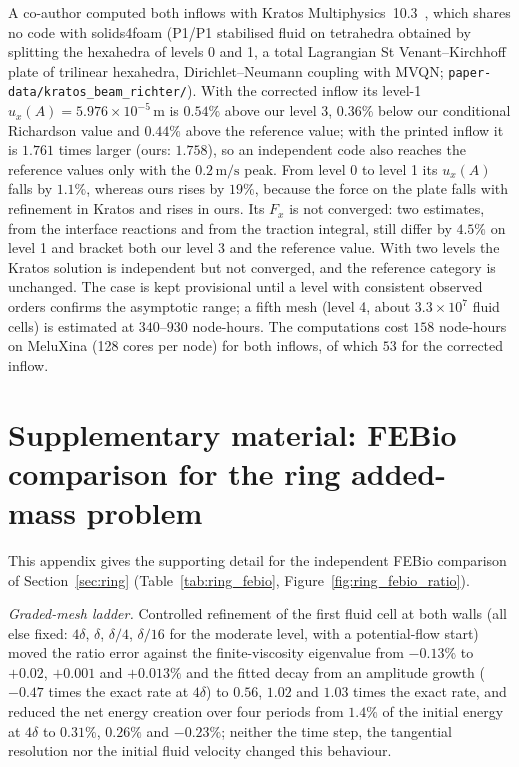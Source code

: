 \documentclass[sn-mathphys,Numbered]{sn-jnl}%
\newif\ifsupplementseparate
\renewcommand\paragraph[1]{\par\addvspace{1.2ex plus .4ex minus .2ex}%
	\noindent{\normalfont\bfseries #1}\hspace{0.5em}\ignorespaces}
\begin{document}
\begin{appendices}
\paragraph{An independent solution.}
A co-author computed both inflows with Kratos Multiphysics~10.3~\citep{Dadvand2010}, which shares no code with solids4foam (P1/P1 stabilised fluid on tetrahedra obtained by splitting the hexahedra of levels 0 and 1, a total Lagrangian St Venant--Kirchhoff plate of trilinear hexahedra, Dirichlet--Neumann coupling with MVQN; \texttt{paper-data/kratos\_beam\_richter/}).
With the corrected inflow its level-1 $u_x(A) = 5.976\times10^{-5}\,\mathrm{m}$ is $0.54\%$ above our level 3, $0.36\%$ below our conditional Richardson value and $0.44\%$ above the reference value; with the printed inflow it is $1.761$ times larger (ours: $1.758$), so an independent code also reaches the reference values only with the $0.2\,\mathrm{m/s}$ peak.
From level 0 to level 1 its $u_x(A)$ falls by $1.1\%$, whereas ours rises by $19\%$, because the force on the plate falls with refinement in Kratos and rises in ours.
Its $F_x$ is not converged: two estimates, from the interface reactions and from the traction integral, still differ by $4.5\%$ on level 1 and bracket both our level 3 and the reference value.
With two levels the Kratos solution is independent but not converged, and the reference category is unchanged.
The case is kept provisional until a level with consistent observed orders confirms the asymptotic range; a fifth mesh (level 4, about $3.3\times10^{7}$ fluid cells) is estimated at $340$--$930$ node-hours.
The computations cost $158$ node-hours on MeluXina (128 cores per node) for both inflows, of which $53$ for the corrected inflow.





\ifsupplementseparate\else
\section{Supplementary material: FEBio comparison for the ring added-mass problem}
\label{app:ring_febio}
This appendix gives the supporting detail for the independent FEBio comparison of Section~\ref{sec:ring} (Table~\ref{tab:ring_febio}, Figure~\ref{fig:ring_febio_ratio}).

\emph{Graded-mesh ladder.}
Controlled refinement of the first fluid cell at both walls (all else fixed: $4\delta$, $\delta$, $\delta/4$, $\delta/16$ for the moderate level, with a potential-flow start) moved the ratio error against the finite-viscosity eigenvalue from $-0.13\%$ to $+0.02$, $+0.001$ and $+0.013\%$ and the fitted decay from an amplitude growth ($-0.47$ times the exact rate at $4\delta$) to $0.56$, $1.02$ and $1.03$ times the exact rate, and reduced the net energy creation over four periods from $1.4\%$ of the initial energy at $4\delta$ to $0.31\%$, $0.26\%$ and $-0.23\%$; neither the time step, the tangential resolution nor the initial fluid velocity changed this behaviour.


\end{appendices}
\end{document}
